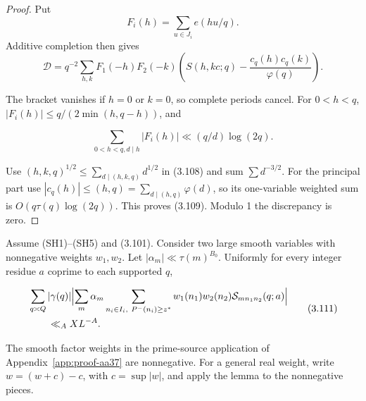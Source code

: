 \begin{proof}
Put
\[
F_i(h)=\sum_{u\in J_i}e(hu/q).
\]
Additive completion then gives
\[
\mathcal D=q^{-2}\sum_{h,k}F_1(-h)F_2(-k)
\left(S(h,kc;q)-\frac{c_q(h)c_q(k)}{\varphi(q)}\right).
\]

The bracket vanishes if
$h=0$ or $k=0$, so complete periods cancel. For $0<h<q$,
$|F_i(h)|\le q/(2\min(h,q-h))$, and

\[
\sum_{0<h<q,d\mid h}|F_i(h)|\ll(q/d)\log(2q).
\tag{3.110}
\]

Use $(h,k,q)^{1/2}\le\sum_{d\mid(h,k,q)}d^{1/2}$ in (3.108)
and sum $\sum d^{-3/2}$. For the principal part use
$|c_q(h)|\le(h,q)=\sum_{d\mid(h,q)}\varphi(d)$, so its
one-variable weighted sum is $O(q\tau(q)\log(2q))$. This proves
(3.109). Modulo 1 the discrepancy is zero.
\end{proof}

\begin{lemma}\label{lem:typeI2}
Assume (SH1)--(SH5) and (3.101).
Consider two large smooth variables with nonnegative weights $w_1,w_2$.
Let $|\alpha_m|\ll\tau(m)^{B_0}$.
Uniformly for every integer residue $a$ coprime to each supported $q$,

\[
\begin{aligned}
&\sum_{q\asymp Q}|\gamma(q)|\Bigl|\sum_m\alpha_m
 \sum_{n_i\in I_i,\ P^-(n_i)\ge z^*}
        w_1(n_1)w_2(n_2)\mathcal S_{mn_1n_2}(q;a)\Bigr|\\
&\qquad\ll_A XL^{-A}.
\end{aligned}
\tag{3.111}
\]
\end{lemma}

The smooth factor weights in the prime-source application of
Appendix~\ref{app:proof-aa37} are nonnegative.
For a general real weight, write $w=(w+c)-c$,
with $c=\sup|w|$, and apply the lemma to the nonnegative pieces.

